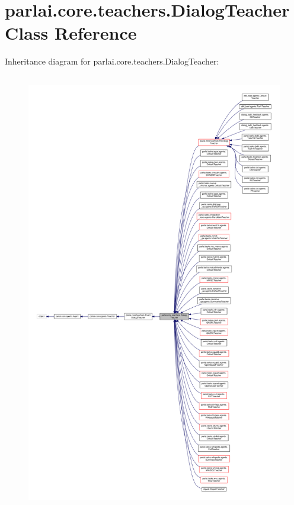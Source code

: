 \hypertarget{classparlai_1_1core_1_1teachers_1_1DialogTeacher}{}\section{parlai.\+core.\+teachers.\+Dialog\+Teacher Class Reference}
\label{classparlai_1_1core_1_1teachers_1_1DialogTeacher}


Inheritance diagram for parlai.\+core.\+teachers.\+Dialog\+Teacher\+:
\nopagebreak
\begin{figure}[H]
\begin{center}
\leavevmode
\includegraphics[height=550pt]{df/d2c/classparlai_1_1core_1_1teachers_1_1DialogTeacher__inherit__graph}
\end{center}
\end{figure}


